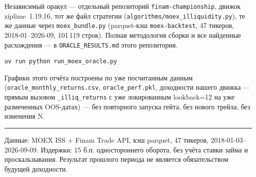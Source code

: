 \documentclass[11pt,a4paper]{article}
\begin{document}
Независимый оракул --- отдельный репозиторий \texttt{finam-championship}, движок ziplime~1.19.16, тот же файл стратегии (\texttt{algorithms/moex\_illiquidity.py}), те же данные через \texttt{moex\_bundle.py} (parquet-кэш \texttt{moex-backtest}, 47 тикеров, 2018-01--2026-09, 101\,119 строк). Полная методология сборки и все найденные расхождения --- в \texttt{ORACLE\_RESULTS.md} этого репозитория.

\begin{center}
\small
\begin{verbatim}
uv run python run_moex_oracle.py
\end{verbatim}
\end{center}

Графики этого отчёта построены по уже посчитанным данным (\texttt{oracle\_monthly\_returns.csv}, \texttt{oracle\_perf.pkl}, доходности нашего движка --- прямым вызовом \texttt{\_illiq\_returns} с уже локированным lookback=12 на уже размеченных OOS-датах) --- без повторного запуска гейта, без нового трейла, без изменения N.

\vspace{1.5em}
{\small\color{muted}\hrule\vspace{0.5em} Данные: MOEX ISS + Finam Trade API, кэш parquet, 47 тикеров, 2018-01-03--2026-09-09. Издержки: 15 б.п. одностороннего оборота, без учёта ставки займа и проскальзывания. Результат прошлого периода не является обязательством будущей доходности.}
\end{document}
